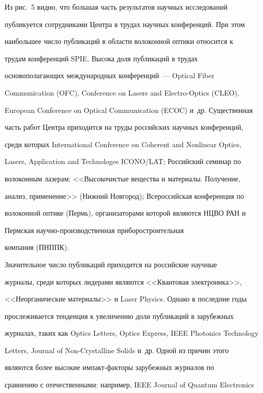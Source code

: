      Из рис.~5 видно, что большая часть результатов научных исследований 


пуб\-ли\-ку\-ет\-ся сотрудниками Центра в трудах научных конференций. При этом 


наибольшее число публикаций в области волоконной оптики относится к 


трудам конференций SPIE. Высока доля публикаций в трудах 


основополагающих международных конференций~--- Optical Fiber 


Communication (OFC), Conference on Lasers and Electro-Optics (CLEO), 


European Conference on Optical Communication (ECOC) и~др. Существенная 


часть работ Центра приходится на труды российских научных конференций, 


среди которых International Conference on Coherent and Nonlinear Optics, 


Lasers, Application and Technologes ICONO/LAT; Российский семинар по 


волоконным лазерам; <<Высокочистые вещества и материалы. Получение, 


анализ, применение>> (Нижний Новгород); Всероссийская конференция по 


волоконной оптике (Пермь), организаторами которой являются НЦВО РАН и 


Пермская на\-уч\-но-про\-из\-вод\-ст\-вен\-ная приборостроительная 


компания (ПНППК).


     


     Значительное число публикаций приходится на российские научные 


журналы, среди которых лидерами являются <<Квантовая электроника>>, 


<<Неорганические материалы>> и Laser Physics. Однако в последние годы 


прослеживается тенденция к увеличению доли публикаций в зарубежных 


журналах, таких как Optics Letters, Optics Express, IEEE Photonics Technology 


Letters, Journal of Non-Crystalline Solids и~др. Одной из причин этого 


являются более высокие им\-пакт-фак\-то\-ры зарубежных журналов по 


сравнению с отечественными: например, IEEE Journal of Quantum Electronics 


